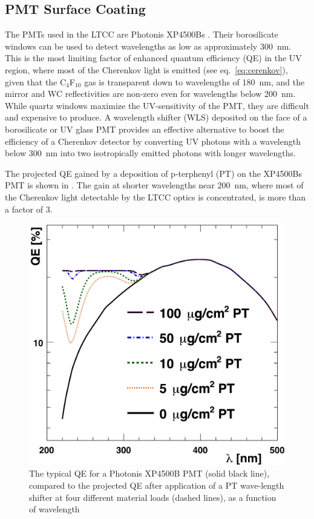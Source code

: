 \subsection{PMT Surface Coating}

The PMTs used in the LTCC are Photonis XP4500Bs \cite{Photonis:2007ta}.
Their borosilicate windows can be used to detect wavelengths as low as approximately
300~nm. This is the most limiting factor of enhanced quantum efficiency (QE) in the UV region, where most of the Cherenkov
light is emitted (see eq.~\ref{eq:cerenkov}), given that the C$_4$F$_{10}$ gas is transparent down to
wavelengths of 180~nm, and the mirror and WC reflectivities are non-zero
even for wavelengths below 200~nm.
While quartz windows maximize the UV-sensitivity of the PMT, they are difficult and expensive to produce.
A wavelength shifter (WLS) deposited on the face of a borosilicate or UV glass
PMT provides an effective alternative to boost the efficiency of a Cherenkov
detector by converting UV photons with a wavelength below 300~nm into two
isotropically emitted photons with longer wavelengths.

The projected QE gained by a deposition of p-terphenyl (PT) on the XP4500Bs
PMT \cite{Koczon:1457653} is shown in .
The gain at shorter wavelengths near 200~nm, where most of the Cherenkov light
detectable by the LTCC optics is concentrated, is more than a factor of 3.

\begin{figure}
	\centering
	\includegraphics[width=0.99\columnwidth, height=0.75\columnwidth]{img/pmtQuantumEfficiencyGain.png}
	\caption{The typical QE for a Photonis XP4500B PMT (solid black line), compared to the projected QE after application
			 of a PT wave-length shifter at four different material loads (dashed lines), as a function of wavelength}
	\label{fig:pmtQuantumEfficiencyGainAndExample}
\end{figure}

